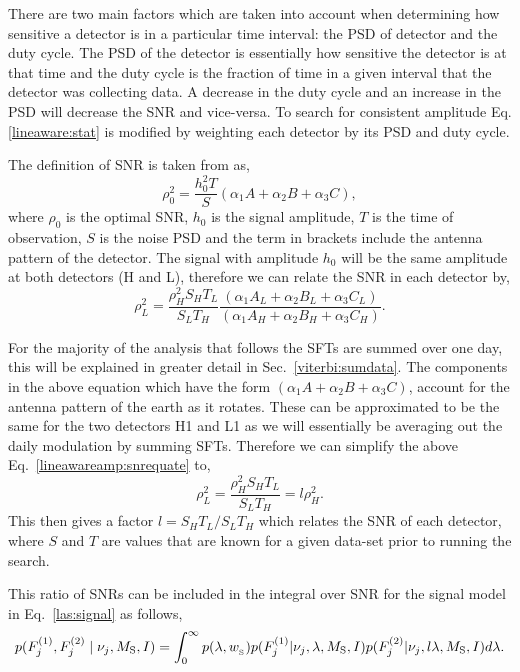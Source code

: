 There are two main factors which are taken into account when determining how sensitive a detector is in a particular time interval: the \ac{PSD} of detector and the duty cycle. The \ac{PSD} of the detector is essentially how sensitive the detector is at that time and the duty cycle is the fraction of time in a given interval that the detector was collecting data. A decrease in the duty cycle and an increase in the \ac{PSD} will decrease the \ac{SNR} and vice-versa. To search for consistent amplitude Eq.\ref{lineaware:stat} is modified by weighting each detector by its \ac{PSD} and duty cycle.

The definition of \ac{SNR} is taken from \citep{} as, 
\begin{equation}
    \rho_0^2 = \frac{h_0^2 T}{S}(\alpha_1A + \alpha_2B + \alpha_3C),
\end{equation}
where $\rho_0$ is the optimal \ac{SNR}, $h_0$ is the signal amplitude, $T$ is the time of observation, $S$ is the noise \ac{PSD} and the term in brackets include the antenna pattern of the detector. 
The signal with amplitude $h_0$ will be the same amplitude at both detectors (H and L), therefore we can relate the \ac{SNR} in each detector by,
\begin{equation}
\label{lineawareamp:snrequate}
    \rho_L^2 = \frac{\rho_H^2 S_H T_L}{S_L T_H} \frac{(\alpha_1A_L + \alpha_2B_L + \alpha_3C_L)}{(\alpha_1A_H + \alpha_2B_H + \alpha_3C_H)} .
\end{equation}

For the majority of the analysis that follows the \acp{SFT} are summed over one day, this will be explained in greater detail in Sec.~\ref{viterbi:sumdata}. 
The components in the above equation which have the form $(\alpha_1A + \alpha_2B + \alpha_3C)$, account for the antenna pattern of the earth as it rotates.
These can be approximated to be the same for the two detectors H1 and L1 as we will essentially be averaging out the daily modulation by summing \acp{SFT}.
Therefore we can simplify the above Eq.~\ref{lineawareamp:snrequate} to, 
\begin{equation}
\label{lineawareamp:snrratio}
    \rho_L^2 = \frac{\rho_H^2 S_H T_L}{S_L T_H} = l \rho_H^2 .
\end{equation}
This then gives a factor $l = S_H T_L/S_L T_H$ which relates the \ac{SNR} of each detector, where $S$ and $T$ are values that are known for a given data-set prior to running the search.

This ratio of \acp{SNR} can be included in the integral over \ac{SNR} for the signal model in Eq.~\ref{las:signal} as follows,
\begin{equation}
\label{lineawareamp:signal}
p(F^{(1)}_{j},F^{(2)}_{j} \mid \nu_j,M_{\rm{S}},I) = \int_0^{\infty}  p(\lambda,w_{\rm_S}) 
p(F^{(1)}_{j}|\nu_j,\lambda,M_{\text{S}},I)p(F^{(2)}_{j}|\nu_j,l\lambda,M_{\text{S}},I) d\lambda.
\end{equation}

